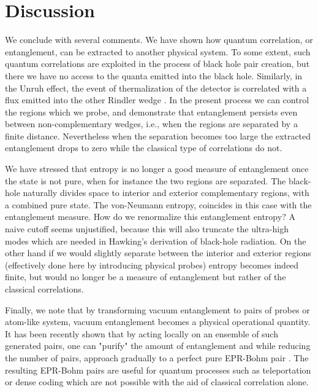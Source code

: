 \documentclass[12pt]{article}
\begin{document}
\section{\bf Discussion }

We conclude with several comments. We have shown how quantum
correlation, or entanglement, can be extracted to another physical
system. To some extent, such quantum correlations are exploited in
the process of black hole pair creation, but there we have no
access to the quanta emitted into the black hole. Similarly, in
the Unruh effect, the event of thermalization of the detector is
correlated with a flux emitted into the other Rindler wedge
\cite{unruhwald}. In the present process we can control the
regions which we probe, and demonstrate that entanglement persists
even between non-complementary wedges, i.e.,  when the regions are
separated by a finite distance. Nevertheless when the separation
becomes too large the extracted entanglement drops to zero while
the classical type of correlations do not.



We have stressed that entropy is no longer a good
measure of entanglement once the state is not pure,
when for instance the two regions are separated.
The black-hole naturally divides space to interior and exterior
complementary regions, with a combined pure state.
The von-Neumann entropy, coincides in this case with the
entanglement
measure.
How do we renormalize this entanglement entropy?
A naive cutoff seems unjustified, because this will
also truncate the ultra-high modes which are needed in
 Hawking's derivation of black-hole radiation.
On the other hand if we would slightly separate between the
interior and exterior regions (effectively done here by
introducing physical probes) entropy becomes indeed finite, but
would no longer be a measure of entanglement but rather of the
classical correlations.

Finally, we note that
by transforming vacuum entanglement
to pairs of probes or atom-like system, vacuum entanglement
becomes a physical operational quantity.
It has been recently shown that by acting locally on
an ensemble of such generated pairs, one can "purify"
the amount of entanglement and while reducing the number of pairs,
approach gradually to a perfect pure EPR-Bohm pair
\cite{purification}.
The resulting EPR-Bohm pairs
are useful for quantum processes such as teleportation
\cite{teleportation}
or dense coding \cite{dense} which are not possible with the aid
of
classical correlation alone.
\end{document}
